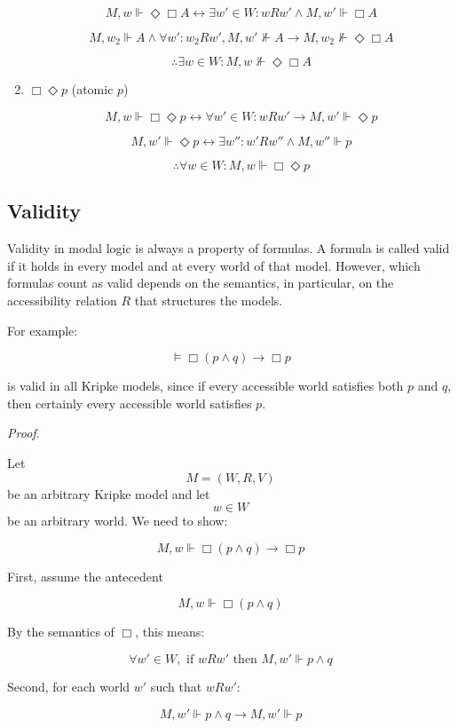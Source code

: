 \documentclass[12pt,a4paper,openany]{article}
\begin{document}
\begin{enumerate}
    $$M, w \Vdash \Diamond \Box A \leftrightarrow \exists w' \in W: w R w' \wedge M, w' \Vdash \Box A$$
    
    $$M, w_2 \Vdash A \wedge \forall w': w_2 R w', M, w' \nVdash A \to M, w_2 \nVdash \Diamond \Box A$$
    
    $$\therefore \exists w \in W: M, w \nVdash \Diamond \Box A$$
    
    \item $\Box \Diamond p$ (atomic $p$)
    
    $$M, w \Vdash \Box \Diamond p \leftrightarrow \forall w' \in W: w R w' \to M, w' \Vdash \Diamond p$$
    
    $$M, w' \Vdash \Diamond p \leftrightarrow \exists w'': w' R w'' \wedge M, w'' \Vdash p$$
    
    $$\therefore \forall w \in W: M, w \Vdash \Box \Diamond p$$
\end{enumerate}

\subsection{Validity}

Validity in modal logic is always a property of formulas. A formula is called valid if it holds in every model and at every world of that model. However, which formulas count as valid depends on the semantics, in particular, on the accessibility relation $R$ that structures the models.

For example:

$$\models \Box(p \land q) \to \Box p$$

is valid in all Kripke models, since if every accessible world satisfies both $p$ and $q$, then certainly every accessible world satisfies $p$.

\textit{Proof.}

Let
$$M = (W, R, V)$$
be an arbitrary Kripke model and let
$$w \in W$$
be an arbitrary world. We need to show:

$$M, w \Vdash \Box(p \land q) \to \Box p$$

First, assume the antecedent

$$M, w \Vdash \Box(p \land q)$$

By the semantics of $\Box$, this means:

$$\forall w' \in W, \text{ if } w R w' \text{ then } M, w' \Vdash p \land q$$

Second, for each world $w'$ such that $w R w'$:

$$M, w' \Vdash p \land q \to M, w' \Vdash p$$
\end{document}
